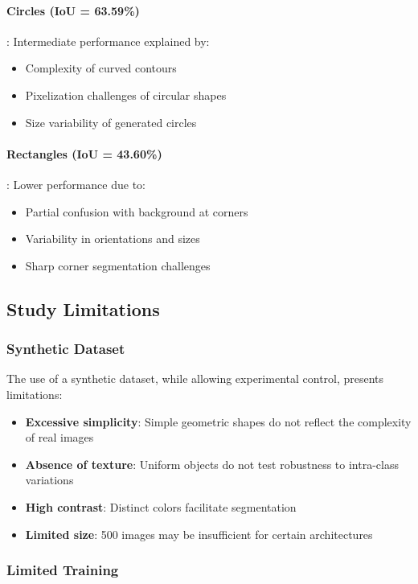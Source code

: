 \documentclass[12pt,a4paper]{article}
\begin{document}
\paragraph{Circles (IoU = 63.59\%)}: Intermediate performance explained by:
\begin{itemize}
    \item Complexity of curved contours
    \item Pixelization challenges of circular shapes
    \item Size variability of generated circles
\end{itemize}

\paragraph{Rectangles (IoU = 43.60\%)}: Lower performance due to:
\begin{itemize}
    \item Partial confusion with background at corners
    \item Variability in orientations and sizes
    \item Sharp corner segmentation challenges
\end{itemize}

\subsection{Study Limitations}

\subsubsection{Synthetic Dataset}

The use of a synthetic dataset, while allowing experimental control, presents limitations:
\begin{itemize}
    \item \textbf{Excessive simplicity}: Simple geometric shapes do not reflect the complexity of real images
    \item \textbf{Absence of texture}: Uniform objects do not test robustness to intra-class variations
    \item \textbf{High contrast}: Distinct colors facilitate segmentation
    \item \textbf{Limited size}: 500 images may be insufficient for certain architectures
\end{itemize}

\subsubsection{Limited Training}
\end{document}
